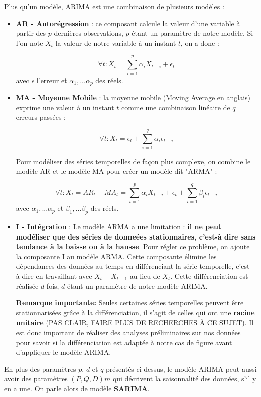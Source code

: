 \documentclass[french]{article}
\begin{document}
    Plus qu'un modèle, ARIMA est une combinaison de plusieurs modèles :
    \begin{itemize}
        \item \textbf{AR - Autorégression} : ce composant calcule la valeur d'une variable à partir des $p$ dernières observations, $p$ étant un paramètre de notre modèle. Si l'on note $X_t$ la valeur de notre variable à un instant $t$, on a donc :

        \begin{equation}\forall t : X_t = \sum_{i=1}^p \alpha_i X_{t-i} + \epsilon_t \end{equation}
        avec $\epsilon$ l'erreur et $\alpha_1,...\alpha_p$ des réels.
        \item \textbf{MA - Moyenne Mobile} : la moyenne mobile (Moving Average en anglais) exprime une valeur à un instant $t$ comme une combinaison linéaire de $q$ erreurs passées :

        \begin{equation}\forall t : X_t = \epsilon_t + \sum_{i=1}^q \alpha_i \epsilon_{t-i} \end{equation}

        Pour modéliser des séries temporelles de façon plus complexe, on combine le modèle AR et le modèle MA pour créer un modèle dit "ARMA" :

        \begin{equation}\forall t : X_t = AR_t + MA_t = \sum_{i=1}^p \alpha_i X_{t-i} + \epsilon_t + \sum_{i=1}^q \beta_i \epsilon_{t-i} \end{equation}
        avec $\alpha_1,...\alpha_p$ et $\beta_1,...\beta_p$ des réels.
        \item \textbf{I - Intégration} : Le modèle ARMA a une limitation : \textbf{il ne peut modéliser que des séries de donneées stationnaires, c'est-à dire sans tendance à la baisse ou à la hausse}. Pour régler ce problème, on ajoute la composante I au modèle ARMA.
        Cette composante élimine les dépendances des données au temps en différenciant la série temporelle, c'est-à-dire en travaillant avec $X_t - X_{t-1}$ au lieu de $X_t$. Cette différenciation est réalisée $d$ fois, $d$ étant un paramètre de notre modèle ARIMA.

        \textbf{Remarque importante: }Seules certaines séries temporelles peuvent être stationnarisées grâce à la différenciation, il s'agit de celles qui ont une \textbf{racine unitaire} (PAS CLAIR, FAIRE PLUS DE RECHERCHES À CE SUJET). Il est donc important de réaliser des analyses préliminaires sur nos données pour savoir si la différenciation est adaptée à notre cas de figure avant d'appliquer le modèle ARIMA.

    \end{itemize}
    En plus des paramètres $p$, $d$ et $q$ présentés ci-dessus, le modèle ARIMA peut aussi avoir des paramètres $(P, Q, D)m$ qui décrivent la saisonnalité des données, s'il y en a une. On parle alors de modèle \textbf{SARIMA}.
    
\end{document}
